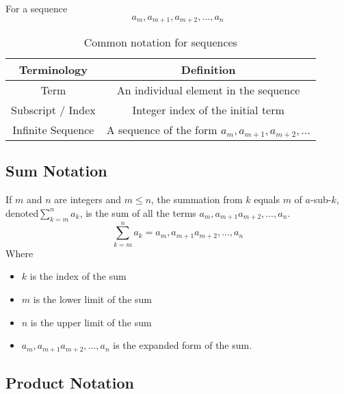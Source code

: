 \documentclass[11pt]{article}
\begin{document}
For a sequence
\begin{equation*}
    a_m, a_{m+1}, a_{m+2}, ... , a_n
\end{equation*}

\begin{table}[!htbp]
    \centering
    \begin{tabular}{ *{2}{c} }
        \toprule
        Terminology & Definition \\
        \midrule
        Term                & An individual element in the sequence \\
        Subscript / Index   & Integer index of the initial term \\
        Infinite Sequence   & A sequence of the form $a_m, a_{m+1}, a_{m+2}, ...$ \\
        \bottomrule
    \end{tabular}
    \label{tab:tbl-sequence-notation}
    \caption{Common notation for sequences}
\end{table}

\subsection{Sum Notation}

\begin{definition}[Sums]\label{def:sum}
    If $m$ and $n$ are integers and $m \leq n$, the summation
    from $k$ equals $m$ of $a$-sub-$k$, denoted$\sum_{k=m}^n a_k$,
    is the sum of all the terms $a_m, a_{m+1} a_{m+2}, ..., a_n$.
    \begin{equation*}
        \sum_{k=m}^n a_k = a_m, a_{m+1} a_{m+2}, ..., a_n
    \end{equation*}
    Where
    \begin{itemize}
        \item $k$ is the index of the sum
        \item $m$ is the lower limit of the sum
        \item $n$ is the upper limit of the sum
        \item $a_m, a_{m+1} a_{m+2}, ..., a_n$ is the expanded form of the sum.
    \end{itemize}
\end{definition}


\subsection{Product Notation}
\end{document}
